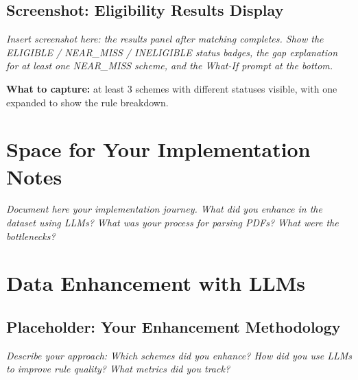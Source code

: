 \documentclass[11pt,a4paper]{report}
\newcommand{\taglabel}[2]{%
  {\footnotesize\bfseries\color{#1}[\,\textsc{#2}\,]}%
}
\newcommand{\tui}{\taglabel{tagUI}{ui}}
\newenvironment{notebox}{%
  \begin{callout}%
}{%
  \end{callout}%
}
\begin{document}
\subsection{Screenshot: Eligibility Results Display}

\begin{callout}[title={\tui~Scheme Recommendations with Gap Analysis}]
\textit{Insert screenshot here: the results panel after matching completes. Show
the ELIGIBLE / NEAR\_MISS / INELIGIBLE status badges, the gap explanation for at
least one NEAR\_MISS scheme, and the What-If prompt at the bottom.}

\vspace{0.4cm}
\textbf{What to capture:} at least 3 schemes with different statuses visible,
with one expanded to show the rule breakdown.
\end{callout}


\section{Space for Your Implementation Notes}

\begin{notebox}
\Large\vspace{3cm}

\noindent\textcolor{dark}{\emph{Document here your implementation journey. What did you enhance in the dataset using LLMs? What was your process for parsing PDFs? What were the bottlenecks?}}

\vspace{3cm}
\end{notebox}

\section{Data Enhancement with LLMs}

\subsection{Placeholder: Your Enhancement Methodology}

\begin{notebox}
\Large\vspace{3cm}

\noindent\textcolor{dark}{\emph{Describe your approach: Which schemes did you enhance? How did you use LLMs to improve rule quality? What metrics did you track?}}

\vspace{3cm}
\end{notebox}
\end{document}
